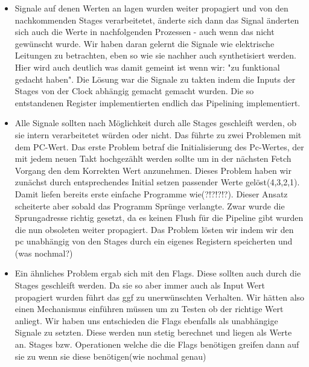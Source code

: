 \documentclass[paper=a4,fontsize=12pt,twocolumn]{scrreprt}
\begin{document}
\begin{itemize}
    \item 
    Signale auf denen Werten an lagen wurden weiter propagiert und von den nachkommenden Stages verarbeitetet, änderte sich dann das Signal änderten sich auch die Werte in nachfolgenden Prozessen - auch wenn das nicht gewünscht wurde.
    Wir haben daran gelernt die Signale wie elektrische Leitungen zu betrachten, eben so wie sie nachher auch synthetisiert werden.
    Hier wird auch deutlich was damit gemeint ist wenn wir: "zu funktional gedacht haben".
    Die Lösung war die Signale zu takten indem die Inputs der Stages von der Clock abhängig gemacht gemacht wurden. Die so entstandenen Register implementierten  endlich das Pipelining implementiert.
    \item Alle Signale sollten nach Möglichkeit durch alle Stages geschleift werden, ob sie intern verarbeitetet würden oder nicht. Das führte zu zwei Problemen mit dem PC-Wert. Das erste Problem betraf die Initialisierung des Pc-Wertes, der mit jedem neuen Takt hochgezählt werden sollte um in der nächsten Fetch Vorgang den dem Korrekten Wert anzunehmen. Dieses Problem  haben wir zunächst durch entsprechendes Initial setzen passender Werte gelöst(4,3,2,1). Damit liefen bereits erste einfache Programme wie(?!?!?!?). Dieser Ansatz scheiterte aber sobald das Programm Sprünge verlangte. Zwar wurde die Sprungadresse richtig gesetzt, da es keinen Flush für die Pipeline gibt wurden die nun obsoleten weiter propagiert. %
    Das Problem lösten wir indem wir den pc unabhängig von den Stages durch ein eigenes Registern speicherten und (was nochmal?)
    \item Ein ähnliches Problem ergab sich mit den Flags. Diese sollten auch durch die Stages geschleift werden. Da sie so aber immer auch als Input Wert propagiert wurden führt das ggf zu unerwünschten Verhalten. Wir hätten also einen Mechanismus einführen müssen um zu Testen ob der richtige Wert anliegt. Wir haben uns entschieden die Flags ebenfalls als unabhängige Signale zu setzten. Diese werden nun stetig berechnet und liegen als Werte an. Stages bzw. Operationen welche die die Flags benötigen greifen dann auf sie zu wenn sie diese benötigen(wie nochmal genau)
\end{itemize}

\end{document}
